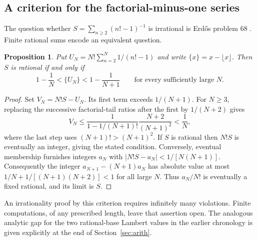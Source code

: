\documentclass[11pt,a4paper]{article}
\newtheorem{proposition}[theorem]{Proposition}
\theoremstyle{definition}
\theoremstyle{remark}
\begin{document}
\subsection{A criterion for the factorial-minus-one series}\label{sec:erdos}
The question whether $S=\sum_{n\ge2}(n!-1)^{-1}$ is irrational is Erd\H{o}s problem 68 \cite{pErdos}. Finite rational sums encode an equivalent question.
\begin{proposition}
Put $U_N=N!\sum_{n=2}^N1/(n!-1)$ and write $\{x\}=x-\lfloor x\rfloor$. Then $S$ is rational if and only if
\[
 1-\frac1N<\{U_N\}<1-\frac1{N+1}
 \qquad\text{for every sufficiently large }N .
\]
\end{proposition}
\begin{proof}
Set $V_N=N!S-U_N$. Its first term exceeds $1/(N+1)$. For $N\ge3$, replacing the successive factorial-tail ratios after the first by $1/(N+2)$ gives
\[
 V_N\le \frac{1}{1-1/(N+1)!}\frac{N+2}{(N+1)^2}<\frac1N,
\]
where the last step uses $(N+1)!>(N+1)^2$. If $S$ is rational then $N!S$ is eventually an integer, giving the stated condition. Conversely, eventual membership furnishes integers $a_N$ with $|N!S-a_N|<1/[N(N+1)]$. Consequently the integer $a_{N+1}-(N+1)a_N$ has absolute value at most $1/N+1/[(N+1)(N+2)]<1$ for all large $N$. Thus $a_N/N!$ is eventually a fixed rational, and its limit is $S$.
\end{proof}
An irrationality proof by this criterion requires infinitely many violations. Finite computations, of any prescribed length, leave that assertion open. The analogous analytic gap for the two rational-base Lambert values in the earlier chronology is given explicitly at the end of Section~\ref{sec:arith}.


\clearpage\appendix
\end{document}
